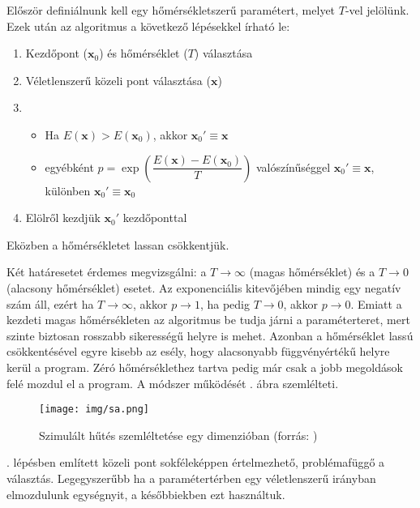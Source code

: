 \documentclass[12pt]{article}
\begin{document}
Először definiálnunk kell egy hőmérsékletszerű paramétert, melyet $T$-vel jelölünk. Ezek után az algoritmus a következő lépésekkel írható le:
\begin{enumerate} %
	\item Kezdőpont ($\mathbf{x}_0$) és hőmérséklet ($T$) választása
	\item Véletlenszerű közeli pont választása ($\mathbf{x}$) \label{veletlen_kozeli_pont}
	\item \begin{itemize} %
		\item Ha $E(\mathbf{x}) > E(\mathbf{x}_0) $, akkor $\mathbf{x}_0' \equiv \mathbf{x}$
		\item egyébként $\displaystyle p = \exp\left(\dfrac{E(\mathbf{x}) - E(\mathbf{x}_0)}{T}\right)$ valószínűséggel $\mathbf{x}_0' \equiv \mathbf{x}$, különben $\mathbf{x}_0' \equiv \mathbf{x}_0$
	\end{itemize}
	\item Elölről kezdjük $\mathbf{x}_0'$ kezdőponttal
\end{enumerate} %
Eközben a hőmérsékletet lassan csökkentjük.

Két határesetet érdemes megvizsgálni: a $T \rightarrow \infty$ (magas hőmérséklet) és a \mbox{$T \rightarrow 0$} (alacsony hőmérséklet) esetet. Az exponenciális kitevőjében mindig egy negatív szám áll, ezért ha $T \rightarrow \infty$, akkor $p \rightarrow 1$, ha pedig $T \rightarrow 0$, akkor $p \rightarrow 0$.
Emiatt a kezdeti magas hőmérsékleten az algoritmus be tudja járni a paraméterteret, mert szinte biztosan rosszabb sikerességű helyre is mehet. Azonban a hőmérséklet lassú csökkentésével egyre kisebb az esély, hogy alacsonyabb függvényértékű helyre kerül a program. Zéró hőmérséklethez tartva pedig már csak a jobb megoldások felé mozdul el a program. A módszer működését . ábra szemlélteti.
\begin{figure}[H]
	\centering
	\texttt{[image: img/sa.png]}
	\caption{Szimulált hűtés szemléltetése egy dimenzióban (forrás: \cite{simulated_annealing_fig})}
	\label{fig:simulated_annealing_szemleltetes}
\end{figure}

. lépésben említett közeli pont sokféleképpen értelmezhető, problémafüggő a választás. Legegyszerűbb ha a paramétertérben egy véletlenszerű irányban elmozdulunk egységnyit, a későbbiekben ezt használtuk.
\end{document}
